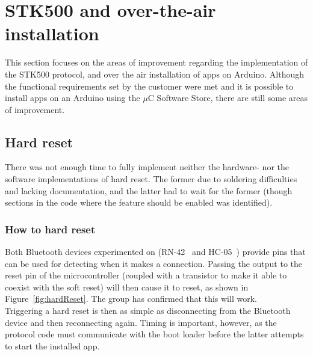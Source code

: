 \section{STK500 and over-the-air installation}
This section focuses on the areas of improvement regarding the implementation of the STK500 protocol, and over the air installation of apps on Arduino. Although the functional requirements set by the customer were met and it is possible to  install apps on an Arduino using the $\mu$C Software Store, there are still some areas of improvement.

	\subsection{Hard reset}
	There was not enough time to fully implement neither the hardware- nor the software implementations of hard reset. The former due to soldering difficulties and lacking documentation, and the latter had to wait for the former (though
    sections in the code where the feature should be enabled was identified).

	   \subsubsection{How to hard reset}
    	Both Bluetooth devices experimented on (RN-42~\cite{rn-42} and HC-05~\cite{hc-05}) provide pins that can be used for detecting when it makes a connection. Passing the output to the reset pin of the microcontroller (coupled with a
        transistor to make it able to coexist with the soft reset) will then cause it to reset, as shown in Figure~\ref{fig:hardReset}. The group has confirmed that this will work.\\

        Triggering a hard reset is then as simple as disconnecting from the Bluetooth device and then reconnecting
        again. Timing is important, however, as the protocol code must communicate with the boot loader before
        the latter attempts to start the installed app.

